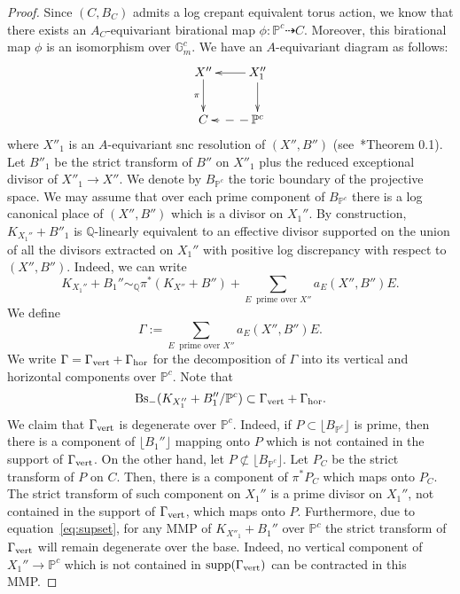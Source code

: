 \documentclass{amsart}
\newcommand{\supp}{\operatorname{supp}}
\newcommand{\pp}{\mathbb{P}}
\renewcommand{\qq}{\mathbb{Q}}
\theoremstyle{remark}
\numberwithin{equation}{section}
\begin{document}
\begin{proof}
Since $(C,B_C)$ admits a log crepant equivalent  torus action,
we know that there exists an $A_C$-equivariant birational map
$\phi\colon \pp^c \dashrightarrow C$.
Moreover, this birational map $\phi$ is an isomorphism over $\mathbb{G}_m^c$.
We have an $A$-equivariant diagram as follows: 
\[
\xymatrix{
X''\ar[d]_-{\pi}  & X''_1\ar[l]\ar[d] \\
C & \pp^c\ar@{-->}[l] \\
}
\]
where $X''_1$ is an $A$-equivariant snc resolution of $(X'',B'')$ (see~\cite{AW97}*{Theorem 0.1}).
Let $B''_1$ be the strict transform of $B''$ on $X''_1$
plus the reduced exceptional divisor of $X''_1\rightarrow X''$.
We denote by $B_{\mathbb{P}^c}$ the toric boundary of the projective space.
We may assume that over each prime component of $B_{\mathbb{P}^c}$ there is a log canonical place of $(X'',B'')$ which is a divisor on $X_1''$.
By construction, $K_{X_1''}+B''_1$ is $\qq$-linearly equivalent to an effective divisor supported on the union of all the divisors 
extracted on $X_1''$ with positive log discrepancy with respect to $(X'',B'')$.
Indeed, we can write
\[
K_{X_1''}+B_1''\sim_\qq 
\pi^*(K_{X''}+B'')+
\sum_{E\ \text{ prime over $X''$}}
a_E(X'',B'')E. 
\]
We define
\[
\Gamma:=\sum_{E\ \text{ prime over $X''$}}
a_E(X'',B'')E.
\]
We write $\Gamma=\Gamma_{\rm vert}+\Gamma_{\rm hor}$
for the decomposition of $\Gamma$ into its vertical
and horizontal components over $\pp^c$.
Note that
\begin{equation}\label{eq:supset}
{\rm Bs}_{-}(K_{X_1''}+B_1''/\pp^c)
\subset \Gamma_{\rm vert}+\Gamma_{\rm hor}.
\end{equation} 
We claim that $\Gamma_{\rm vert}$ is degenerate over $\pp^c$.
Indeed, if $P\subset \lfloor B_{\pp^c}\rfloor$ is prime,
then there is a component of $\lfloor B_1''\rfloor$ mapping
onto $P$ which is not contained in the support of $\Gamma_{\rm vert}$.
On the other hand, let $P\not\subset \lfloor B_{\pp^c}\rfloor$.
Let $P_C$ be the strict transform of $P$ on $C$.
Then, there is a component of $\pi^*P_C$ which maps onto $P_C$.
The strict transform of such component on $X_1''$ is a prime 
divisor on $X_1''$, not contained in the support of $\Gamma_{\rm vert}$, which maps onto $P$.
Furthermore, due to equation~\ref{eq:supset},
for any MMP of $K_{X''_1}+B_1''$ over $\pp^c$
the strict transform of $\Gamma_{\rm vert}$ will remain
degenerate over the base.
Indeed, no vertical component of $X_1''\rightarrow \pp^c$
which is not contained in $\supp(\Gamma_{\rm vert})$
can be contracted in this MMP.


\end{proof}
\end{document}
